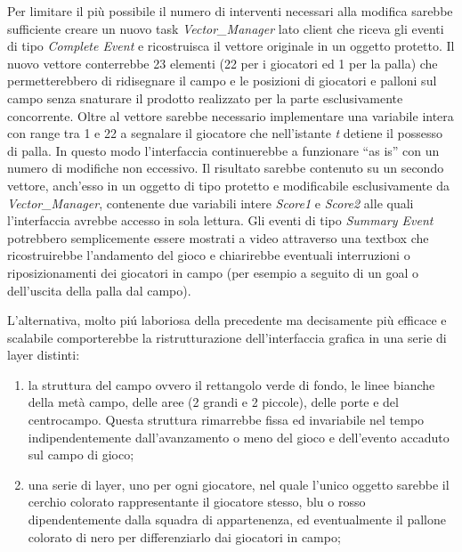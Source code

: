 \documentclass[aps,letterpaper,10pt]{article}
\begin{document}
Per limitare il pi\`u possibile il numero di interventi necessari alla modifica sarebbe sufficiente creare un nuovo task \emph{Vector\_Manager} lato client che riceva gli eventi di tipo \emph{Complete Event} e ricostruisca il vettore originale in un oggetto protetto. Il nuovo vettore conterrebbe 23 elementi (22 per i giocatori ed 1 per la palla) che permetterebbero di ridisegnare il campo e le posizioni di giocatori e palloni sul campo senza snaturare il prodotto realizzato per la parte esclusivamente concorrente. Oltre al vettore sarebbe necessario implementare una variabile intera con range tra 1 e 22 a segnalare il giocatore che nell'istante \emph{t} detiene il possesso di palla. In questo modo l'interfaccia continuerebbe a funzionare ``as is'' con un numero di modifiche non eccessivo. Il risultato sarebbe contenuto su un secondo vettore, anch'esso in un oggetto di tipo protetto e modificabile esclusivamente da \emph{Vector\_Manager}, contenente due variabili intere \emph{Score1} e \emph{Score2} alle quali l'interfaccia avrebbe accesso in sola lettura. Gli eventi di tipo \emph{Summary Event} potrebbero semplicemente essere mostrati a video attraverso una textbox che ricostruirebbe l'andamento del gioco e chiarirebbe eventuali interruzioni o riposizionamenti dei giocatori in campo (per esempio a seguito di un goal o dell'uscita della palla dal campo). \vspace{3mm}

L'alternativa, molto pi\'u laboriosa della precedente ma decisamente pi\`u efficace e scalabile comporterebbe la ristrutturazione dell'interfaccia grafica in una serie di layer distinti:

\begin{enumerate}
	\item la struttura del campo ovvero il rettangolo verde di fondo, le linee bianche della met\`a campo, delle aree (2 grandi e 2 piccole), delle porte e del centrocampo. Questa struttura rimarrebbe fissa ed invariabile nel tempo indipendentemente dall'avanzamento o meno del gioco e dell'evento accaduto sul campo di gioco;
	\item una serie di layer, uno per ogni giocatore, nel quale l'unico oggetto sarebbe il cerchio colorato rappresentante il giocatore stesso, blu o rosso dipendentemente dalla squadra di appartenenza, ed eventualmente il pallone colorato di nero per differenziarlo dai giocatori in campo;
\end{enumerate}
\end{document}
